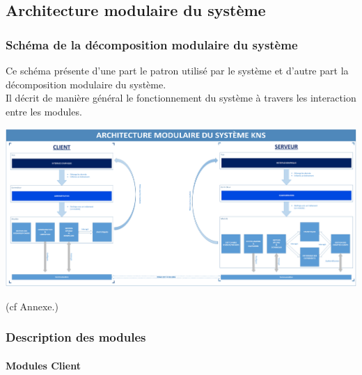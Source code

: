 \documentclass[10pt,a4paper]{report}
\begin{document}
	\subsection{Architecture modulaire du système}

		\subsubsection{Schéma de la décomposition modulaire du système}
			\begin{flushleft}
			Ce schéma présente d'une part le patron utilisé par le système et d'autre part la décomposition modulaire du système.\\
			Il décrit de manière général le fonctionnement du système à travers les interaction entre les modules.
			\end{flushleft}
			\begin{center}
				\includegraphics[scale=0.23]{Ressources/modules_KNS.png}
			\end{center}
		(cf Annexe.)

\newpage
		\subsubsection{Description des modules}
	
			\paragraph{Modules Client}
\end{document}
